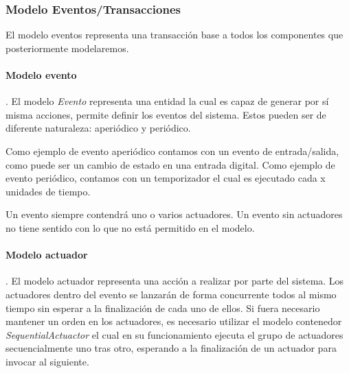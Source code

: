 \subsubsection{Modelo Eventos/Transacciones}

El modelo eventos representa una transacción base a todos los componentes que posteriormente modelaremos.





\paragraph{Modelo evento}.
El modelo \textit{Evento} representa una entidad la cual es capaz de generar por sí misma acciones, permite definir los eventos del sistema. Estos pueden ser de diferente naturaleza: aperiódico y periódico.

Como ejemplo de evento aperiódico contamos con un evento de entrada/salida, como puede ser un cambio de estado en una entrada digital. Como ejemplo de evento periódico, contamos con un temporizador el cual es ejecutado cada x unidades de tiempo. 

Un evento siempre contendrá uno o varios actuadores. Un evento sin actuadores no tiene sentido con lo que no está permitido en el modelo.



\paragraph{Modelo actuador}.
El modelo actuador representa una acción a realizar por parte del sistema. Los actuadores dentro del evento se lanzarán de forma concurrente todos al mismo tiempo sin esperar a la finalización de cada uno de ellos. Si fuera necesario mantener un orden en los actuadores, es necesario utilizar el modelo contenedor \textit{SequentialActuactor} el cual en su funcionamiento ejecuta el grupo de actuadores secuencialmente uno tras otro, esperando a la finalización de un actuador para invocar al siguiente.

